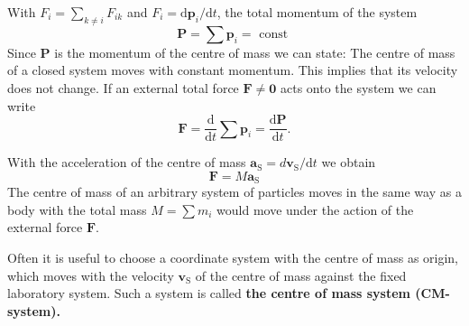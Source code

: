 \documentclass[12pt]{book}
\theoremstyle{definition}\newtheorem{dfn}{Définition}[chapter]
\theoremstyle{plain}\newtheorem{thm}{Théorème}[chapter]
\theoremstyle{plain}\newtheorem{prp}{Proposition}[chapter]
\theoremstyle{plain}\newtheorem{lem}{\bf Lemme}[chapter]
\theoremstyle{plain}\newtheorem{axm}{\bf Axiome}[chapter]
\theoremstyle{plain}\newtheorem{lmm}{\bf Lemme}[chapter]
\theoremstyle{plain}\newtheorem{cor}{\bf Corollaire}[chapter]
\theoremstyle{remark}\newtheorem{rem}{Remarque}[chapter]
\begin{document}
With $F_{i}=\sum_{k \neq i} F_{i k}$ and $F_{i}=\mathrm{d} \boldsymbol{p}_{i} / \mathrm{d} t$, the total momentum of the system 
\begin{equation}
\boldsymbol{P}=\sum \boldsymbol{p}_{i}=\text { const }
\end{equation}
Since $\boldsymbol{P}$ is the momentum of the centre of mass we can state:
The centre of mass of a closed system moves with constant momentum. This implies that its velocity does not change.
If an external total force $\boldsymbol{F} \neq \mathbf{0}$ acts onto the system we can write
\begin{equation}
\boldsymbol{F}=\frac{\mathrm{d}}{\mathrm{d} t} \sum \boldsymbol{p}_{i}=\frac{\mathrm{d} \boldsymbol{P}}{\mathrm{d} t}.
\end{equation}

With the acceleration of the centre of mass $\boldsymbol{a_{\mathrm{S}}}=d \boldsymbol{v_{\mathrm{S}}} / \mathrm{d} t$ we obtain
\begin{equation}
\boldsymbol{F}=M \boldsymbol{a_{\mathrm{S}}}
\end{equation}
The centre of mass of an arbitrary system of particles moves in the same way as a body with the total mass $M=\sum m_{i}$ would move under the action of the external force $\boldsymbol{F}$.

Often it is useful to choose a coordinate system with the centre of mass as origin, which moves with the velocity $\boldsymbol{v_{\mathrm{S}}}$ of the centre of mass against the fixed laboratory system. Such a system is called {\bf the centre of mass system (CM-system).}
\end{document}
